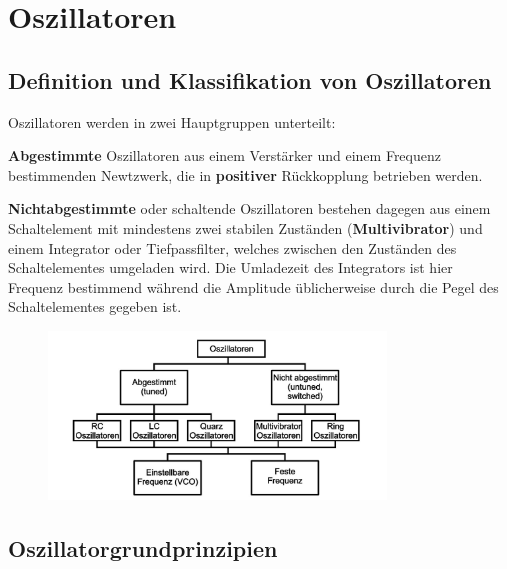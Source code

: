 \section {Oszillatoren}
\subsection {Definition und Klassifikation von Oszillatoren } 
\raggedright

Oszillatoren werden in zwei Hauptgruppen unterteilt:
\begin{compactitem}
    \item \textbf{Abgestimmte} Oszillatoren aus einem Verstärker und einem Frequenz bestimmenden Newtzwerk, die in \textbf{positiver} Rückkopplung betrieben werden.
    \item \textbf{Nichtabgestimmte} oder schaltende Oszillatoren bestehen dagegen aus einem Schaltelement mit mindestens zwei stabilen Zuständen (\textbf{Multivibrator}) und einem Integrator oder Tiefpassfilter, welches zwischen den Zuständen des Schaltelementes umgeladen wird. Die Umladezeit des Integrators ist hier Frequenz bestimmend während die Amplitude üblicherweise durch die Pegel des Schaltelementes gegeben ist.
\end{compactitem}
 
\centering
\begin{figure}[h!]
  \centering
  \includegraphics[width=0.8\textwidth]{images/Klassifikation_Oszillatortypen}
\end{figure}

\FloatBarrier
\subsection{Oszillatorgrundprinzipien}
